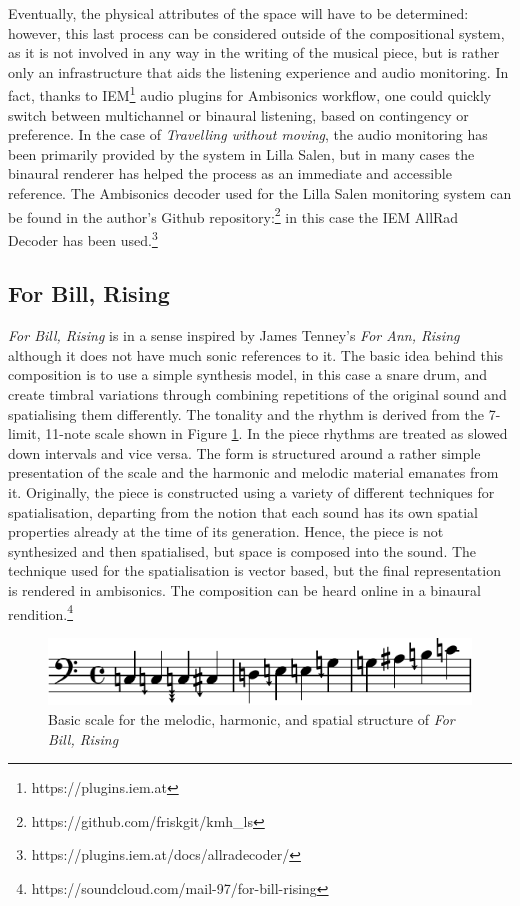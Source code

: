 \documentclass{article}
\begin{document}
        Eventually, the physical attributes of the space will have to be determined: however, this last process can be considered outside of the compositional system, as it is not involved in any way in the writing of the musical piece, but is rather only an infrastructure that aids the listening experience and audio monitoring. In fact, thanks to IEM\footnote{https://plugins.iem.at} audio plugins for Ambisonics workflow, one could quickly switch between multichannel or binaural listening, based on contingency or preference. In the case of \textit{Travelling without moving}, the audio monitoring has been primarily provided by the system in Lilla Salen, but in many cases the binaural renderer has helped the process as an immediate and accessible reference. The Ambisonics decoder used for the Lilla Salen monitoring system can be found in the author's Github repository:\footnote{https://github.com/friskgit/kmh{\_}ls} in this case the IEM AllRad Decoder has been used.\footnote{https://plugins.iem.at/docs/allradecoder/}

    \subsection{For Bill, Rising}
    \textit{For Bill, Rising} is in a sense inspired by James Tenney's \textit{For Ann, Rising} although it does not have much sonic references to it. The basic idea behind this composition is to use a simple synthesis model, in this case a snare drum, and create timbral variations through combining repetitions of the original sound and spatialising them differently. The tonality and the rhythm is derived from the 7-limit, 11-note scale shown in Figure \ref{fig:score}. In the piece rhythms are treated as slowed down intervals and vice versa. The form is structured around a rather simple presentation of the scale and the harmonic and melodic material emanates from it. Originally, the piece is constructed using a variety of different techniques for spatialisation, departing from the notion that each sound has its own spatial properties already at the time of its generation. Hence, the piece is not synthesized and then spatialised, but space is composed into the sound. The technique used for the spatialisation is vector based, but the final representation is rendered in ambisonics. The composition can be heard online in a binaural rendition.\footnote{https://soundcloud.com/mail-97/for-bill-rising}

    \begin{figure}
        \centering
    \includegraphics[width=\linewidth]{SMC_2024_Paper/micro.pdf}
        \caption{Basic scale for the melodic, harmonic, and spatial structure of \textit{For Bill, Rising}}
        \label{fig:score}
    \end{figure}
    
\end{document}
